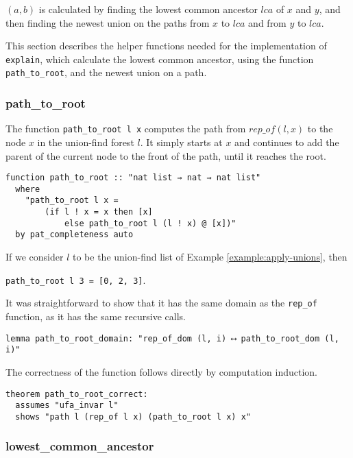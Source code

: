 $(a, b)$ is calculated by finding the lowest common ancestor $lca$ of $x$ and $y$, and then finding the newest union on the paths from $x$ to $lca$ and from $y$ to $lca$.

This section describes the helper functions needed for the implementation of \lstinline|explain|, which calculate the lowest common ancestor, using the function \lstinline{path_to_root}, and the newest union on a path.

\subsubsection{path\_to\_root}
\label{subsubsection:path-to-root}

The function \lstinline{path_to_root l x} computes the path from $rep\_of(l,x)$ to the node $x$ in the union-find forest $l$. It simply starts at $x$ and continues to add the parent of the current node to the front of the path, until it reaches the root.

\begin{lstlisting}
function path_to_root :: "nat list ⇒ nat ⇒ nat list"
  where
    "path_to_root l x =
        (if l ! x = x then [x]
            else path_to_root l (l ! x) @ [x])"
  by pat_completeness auto
\end{lstlisting}

\begin{exmp}
If we consider $l$ to be the union-find list of Example \ref{example:apply-unions}, then

\lstinline|path_to_root l 3 = [0, 2, 3]|.
\end{exmp}

It was straightforward to show that it has the same domain as the \lstinline{rep_of} function, as it has the same recursive calls.

\begin{lstlisting}
lemma path_to_root_domain: "rep_of_dom (l, i) ⟷ path_to_root_dom (l, i)"
\end{lstlisting}

The correctness of the function follows directly by computation induction.

\begin{lstlisting}
theorem path_to_root_correct:
  assumes "ufa_invar l"
  shows "path l (rep_of l x) (path_to_root l x) x"
\end{lstlisting}

\subsubsection{lowest\_common\_ancestor}

